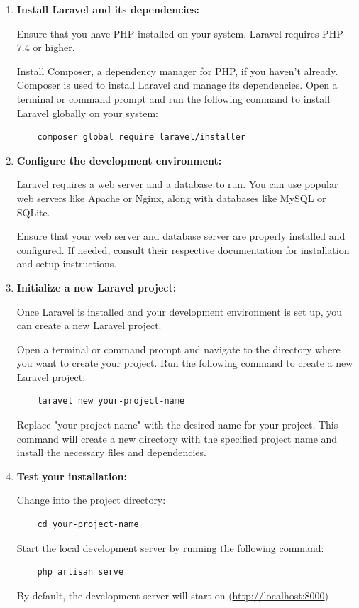  \begin{enumerate}
\item \textbf{Install Laravel and its dependencies:}
  
Ensure that you have PHP installed on your system. Laravel requires PHP 7.4 or higher.
  
Install Composer, a dependency manager for PHP, if you haven't already. Composer is used to install Laravel and manage its dependencies.
  Open a terminal or command prompt and run the following command to install Laravel globally on your system:
   \begin{verbatim}
    composer global require laravel/installer
   \end{verbatim}
   

\item \textbf{Configure the development environment:}
  
Laravel requires a web server and a database to run. You can use popular web servers like Apache or Nginx, along with databases like MySQL or SQLite.
  
Ensure that your web server and database server are properly installed and configured. If needed, consult their respective documentation for installation and setup instructions.
\newpage
\item \textbf{Initialize a new Laravel project:}
 
Once Laravel is installed and your development environment is set up, you can create a new Laravel project.
  
Open a terminal or command prompt and navigate to the directory where you want to create your project.
  Run the following command to create a new Laravel project:
   \begin{verbatim}
    laravel new your-project-name 
   \end{verbatim}
   
   Replace "your-project-name" with the desired name for your project. This command will create a new directory with the specified project name and install the necessary files and dependencies.

\item \textbf{Test your installation:}
  
Change into the project directory:
\begin{verbatim}
    cd your-project-name
\end{verbatim}
   
Start the local development server by running the following command:
\begin{verbatim}
    php artisan serve
\end{verbatim}
  By default, the development server will start on (\url{http://localhost:8000}) 
  

\end{enumerate}
